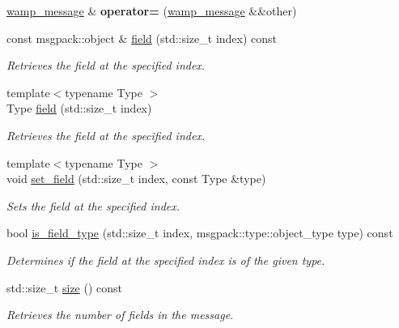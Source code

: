 \begin{DoxyCompactItemize}
\item 
\hyperlink{classautobahn_1_1wamp__message}{wamp\+\_\+message} \& {\bfseries operator=} (\hyperlink{classautobahn_1_1wamp__message}{wamp\+\_\+message} \&\&other)\hypertarget{classautobahn_1_1wamp__message_ab8d6c9131640e48b8773fe18e5a36432}{}\label{classautobahn_1_1wamp__message_ab8d6c9131640e48b8773fe18e5a36432}

\item 
const msgpack\+::object \& \hyperlink{classautobahn_1_1wamp__message_a9804a6f45c3677cff4413a8c07a37598}{field} (std\+::size\+\_\+t index) const 
\begin{DoxyCompactList}\small\item\em Retrieves the field at the specified index. \end{DoxyCompactList}\item 
{\footnotesize template$<$typename Type $>$ }\\Type \hyperlink{classautobahn_1_1wamp__message_a735b9160e14f1b0530ea564927668a6e}{field} (std\+::size\+\_\+t index)
\begin{DoxyCompactList}\small\item\em Retrieves the field at the specified index. \end{DoxyCompactList}\item 
{\footnotesize template$<$typename Type $>$ }\\void \hyperlink{classautobahn_1_1wamp__message_a16c244c17216a13baf9e59bd74285f64}{set\+\_\+field} (std\+::size\+\_\+t index, const Type \&type)
\begin{DoxyCompactList}\small\item\em Sets the field at the specified index. \end{DoxyCompactList}\item 
bool \hyperlink{classautobahn_1_1wamp__message_ac44296cb6a660ff0ee91ee3790e5c952}{is\+\_\+field\+\_\+type} (std\+::size\+\_\+t index, msgpack\+::type\+::object\+\_\+type type) const 
\begin{DoxyCompactList}\small\item\em Determines if the field at the specified index is of the given type. \end{DoxyCompactList}\item 
std\+::size\+\_\+t \hyperlink{classautobahn_1_1wamp__message_a2076474f6f32eb4bcf24c0cc305dfc49}{size} () const 
\begin{DoxyCompactList}\small\item\em Retrieves the number of fields in the message. \end{DoxyCompactList}\item 

\end{DoxyCompactItemize}
